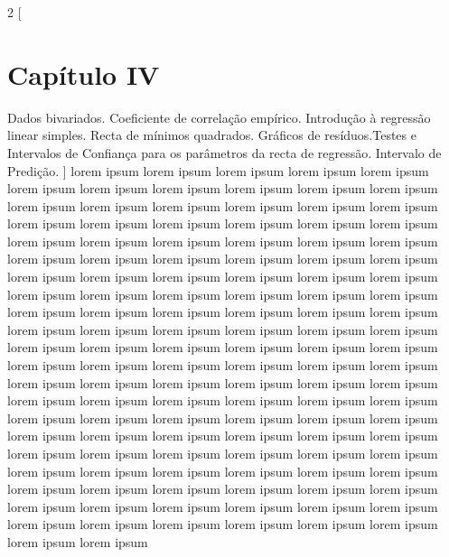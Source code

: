 \begin{multicols}{2}
    [
        \section{Capítulo IV}
        Dados bivariados. Coeficiente de correlação empírico. Introdução à regressão linear simples. Recta de mínimos quadrados. Gráficos de resíduos.Testes e Intervalos de Confiança para os parâmetros da recta de regressão. Intervalo de Predição.
    ]
    lorem ipsum lorem ipsum lorem ipsum lorem ipsum lorem ipsum lorem ipsum lorem ipsum lorem ipsum lorem ipsum lorem ipsum lorem ipsum lorem ipsum lorem ipsum lorem ipsum lorem ipsum lorem ipsum lorem ipsum lorem ipsum lorem ipsum lorem ipsum lorem ipsum lorem ipsum lorem ipsum lorem ipsum lorem ipsum lorem ipsum lorem ipsum lorem ipsum lorem ipsum lorem ipsum lorem ipsum lorem ipsum lorem ipsum lorem ipsum lorem ipsum lorem ipsum lorem ipsum lorem ipsum lorem ipsum lorem ipsum lorem ipsum lorem ipsum lorem ipsum lorem ipsum lorem ipsum lorem ipsum lorem ipsum lorem ipsum lorem ipsum lorem ipsum lorem ipsum lorem ipsum lorem ipsum lorem ipsum lorem ipsum lorem ipsum lorem ipsum lorem ipsum lorem ipsum lorem ipsum lorem ipsum lorem ipsum lorem ipsum lorem ipsum lorem ipsum lorem ipsum lorem ipsum lorem ipsum lorem ipsum lorem ipsum lorem ipsum lorem ipsum lorem ipsum lorem ipsum lorem ipsum lorem ipsum lorem ipsum lorem ipsum lorem ipsum lorem ipsum lorem ipsum lorem ipsum lorem ipsum lorem ipsum lorem ipsum lorem ipsum lorem ipsum lorem ipsum lorem ipsum lorem ipsum lorem ipsum lorem ipsum lorem ipsum lorem ipsum lorem ipsum lorem ipsum lorem ipsum lorem ipsum lorem ipsum lorem ipsum lorem ipsum lorem ipsum lorem ipsum lorem ipsum lorem ipsum lorem ipsum lorem ipsum lorem ipsum lorem ipsum lorem ipsum lorem ipsum lorem ipsum lorem ipsum lorem ipsum lorem ipsum lorem ipsum lorem ipsum lorem ipsum lorem ipsum lorem ipsum lorem ipsum lorem ipsum lorem ipsum lorem ipsum lorem ipsum lorem ipsum lorem ipsum 
    \end{multicols}